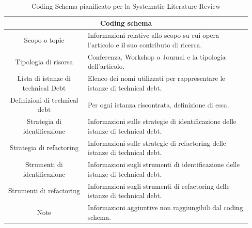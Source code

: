\begin{table}[h!]
    \centering
    \begin{tabular}{|c|p{6cm}|}
        \multicolumn{2}{c}{\textbf{Coding schema}} \\
        
        \hline
        Scopo o topic & Informazioni relative allo scopo su cui opera l'articolo e il suo contributo di ricerca. \\
        \hline
        Tipologia di risorsa & Conferenza, Workshop o Journal e la tipologia dell'articolo.\\
        \hline
        Lista di istanze di technical Debt & Elenco dei nomi utilizzati per rappresentare le istanze di technical debt.\\
        \hline
        Definizioni di technical debt & Per ogni istanza riscontrata, definizione di essa. \\
        \hline
        Strategia di identificazione & Informazioni sulle strategie di identificazione delle istanze di technical debt. \\
         \hline
        Strategia di refactoring & Informazioni sulle strategie di refactoring delle istanze di technical debt. \\
         \hline
        Strumenti di identificazione & Informazioni sugli strumenti di identificazione delle istanze di technical debt. \\
        \hline
        Strumenti di refactoring & Informazioni sugli strumenti di refactoring delle istanze di technical debt. \\
        \hline
        Note & Informazioni aggiuntive non raggiungibili dal coding schema. \\
        \hline
    \end{tabular}
    \caption{Coding Schema pianificato per la Systematic Literature Review}
    \label{tab:coding_schema}
\end{table}


